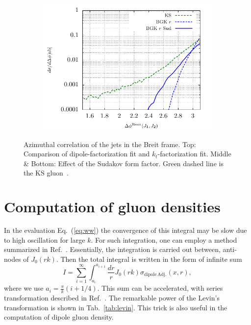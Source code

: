 \documentclass[a4,12pt]{article}
\newcommand{\sdpa}[0]{\sigma_{\mathrm{dipole\,Adj.}}}
\begin{document}
\begin{figure}[p]
\begin{subfigure}{0.48\textwidth}
	\end{subfigure}
	\begin{subfigure}{0.48\textwidth}
		\includegraphics[width=\textwidth]{gnuplot/plotBGK3Jets}
	\end{subfigure}
\caption{\footnotesize Azimuthal correlation of the jets in the Breit frame. Top: Comparison of dipole-factorization fit and $k_t$-factorization fit. Middle \& Bottom: Effect of the Sudakov form factor. Green dashed line is the KS gluon~\cite{vanHameren:2021sqc}. }
\label{fig:jj-breit}
\end{figure}



\appendix	
\section{Computation of gluon densities}
In the evaluation Eq.~(\ref{eq:ww}) the convergence of this integral may be slow due to high oscillation for large $k$.
For such integration, one can employ a method summarized in Ref.~\cite{LYNESS1985109}. 
Essentially, the integration is carried out between, anti-nodes of $J_0(rk)$. Then the total integral is written in the form of infinite sum
\begin{equation}
	I=\sum^\infty_{i=1} \int^{a_{i+1}}_{a_i} \frac{dr}{r}J_0(r k) \sdpa(x,r),
\end{equation}
where we use $a_{i}=\frac{\pi}{k}(i+1/4)$.
This sum can be accelerated, with series transformation described in Ref.~\cite{doi:10.1080/00207167308803075,Weniger:1989rea,HOMEIER19951}.
The remarkable power of the Levin's transformation is shown in Tab.~\ref{tab:levin}.
This trick is also useful in the computation of dipole gluon density. 
\end{document}
